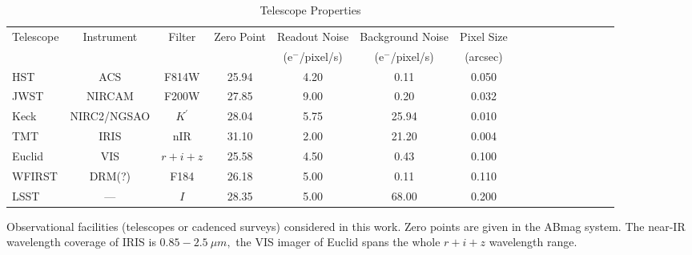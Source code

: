 \documentclass[a4paper,11pt]{article}
\begin{document}
\clearpage
\begin{table}\footnotesize
\begin{center}
\caption{Telescope Properties}
\begin{tabular}{lccccccccccccccc|}
\hline \hline
Telescope & Instrument & Filter & Zero Point & Readout Noise & Background Noise & Pixel Size \\
 & & & & (e$^-$/pixel/s) & (e$^-$/pixel/s) & (arcsec) \\
\hline
HST  & ACS  &   F814W   &   25.94    &   4.20      &    0.11     &     0.050    \\
  JWST & NIRCAM  &   F200W   &    27.85   &    9.00     &     0.20    &      0.032  \\
  Keck & NIRC2/NGSAO  &  $K^\prime$ &   28.04    &   5.75     &  25.94      &  0.010      \\
  TMT & IRIS  &  nIR   &    31.10   &      2.00   &     21.20    &      0.004  \\
  Euclid & VIS & $r+i+z$  &    25.58   &      4.50   &     0.43    &      0.100   \\
  WFIRST &  DRM(?) & F184    &   26.18    &     5.00    &    0.11     &     0.110   \\
  LSST   & ---  &   $I$    &     28.35  &       5.00  &      68.00   &        0.200  \\
\hline
\hline
\end{tabular}
\begin{tablenotes}
\item 
Observational facilities (telescopes or cadenced surveys) considered in this work.
 Zero points are given in the ABmag system. The near-IR wavelength coverage of IRIS is $0.85-2.5~\mu m,$ the VIS imager of Euclid spans the whole $r+i+z$ wavelength range. \\
\end{tablenotes}
\label{tab:telescopes parameters}
\end{center}
\end{table}
\end{document}
